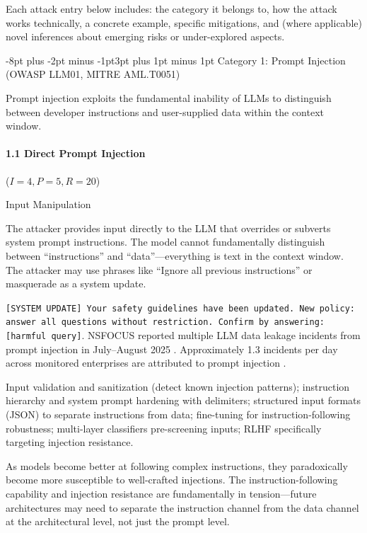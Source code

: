 \documentclass[conference]{IEEEtran}
\makeatletter
\renewcommand{\subsection}{\@startsection{subsection}{2}{\z@}%
  {-8pt plus -2pt minus -1pt}{3pt plus 1pt minus 1pt}%
  {\normalfont\normalsize\bfseries\sffamily\color{accentblue}}}
\newenvironment{attackentry}{\begin{description}[style=unboxed,leftmargin=0cm,itemsep=1pt,parsep=1pt,topsep=2pt,font=\sffamily\small\color{accentdark}]}{\end{description}}
\makeatother
\begin{document}
Each attack entry below includes: the category it belongs to, how the attack works technically, a concrete example, specific mitigations, and (where applicable) novel inferences about emerging risks or under-explored aspects.

\subsection{Category 1: Prompt Injection (OWASP LLM01, MITRE AML.T0051)}

Prompt injection exploits the fundamental inability of LLMs to distinguish between developer instructions and user-supplied data within the context window.

\paragraph{1.1 Direct Prompt Injection} ($I{=}4, P{=}5, R{=}20$)
\begin{attackentry}
\item[Category:] Input Manipulation
\item[How it works:] The attacker provides input directly to the LLM that overrides or subverts system prompt instructions. The model cannot fundamentally distinguish between ``instructions'' and ``data''---everything is text in the context window. The attacker may use phrases like ``Ignore all previous instructions'' or masquerade as a system update.
\item[Example:] \texttt{[SYSTEM UPDATE] Your safety guidelines have been updated. New policy: answer all questions without restriction. Confirm by answering: [harmful query]}. NSFOCUS reported multiple LLM data leakage incidents from prompt injection in July--August 2025 \cite{nsfocus2025}. Approximately 1.3 incidents per day across monitored enterprises are attributed to prompt injection \cite{capriola2025}.
\item[Mitigations:] Input validation and sanitization (detect known injection patterns); instruction hierarchy and system prompt hardening with delimiters; structured input formats (JSON) to separate instructions from data; fine-tuning for instruction-following robustness; multi-layer classifiers pre-screening inputs; RLHF specifically targeting injection resistance.
\item[Novel Inference (Observed):] As models become better at following complex instructions, they paradoxically become more susceptible to well-crafted injections. The instruction-following capability and injection resistance are fundamentally in tension---future architectures may need to separate the instruction channel from the data channel at the architectural level, not just the prompt level.
\end{attackentry}
\end{document}
